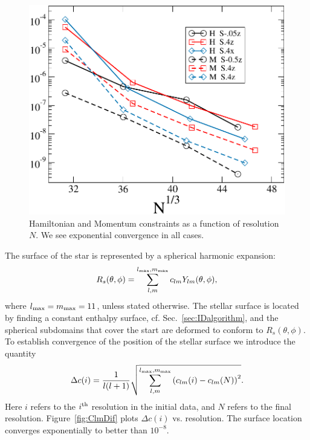 \documentclass[aps,prd,amsmath,floatfix
,twocolumn
,superscriptaddress,nofootinbib,showpacs]{revtex4-1}
\theoremstyle{plain} \newtheorem{thm}{Theorem} \newtheorem{lem}{Lemma}
\begin{document}
\begin{figure}
\includegraphics[width=0.95\columnwidth]{HamMom}
\caption{{\label{fig:HamMom}}Hamiltonian and Momentum constraints as a function of resolution $N$. We see exponential
  convergence in all cases.}
\end{figure}

 The surface of the star is represented by a spherical harmonic expansion:
\begin{equation}
R_s(\theta,\phi) = \sum^{l_{\rm max},m_{\rm
    max}}_{l,m}c_{lm}Y_{lm}(\theta,\phi),
\end{equation}
where $l_{\rm max}= m_{\rm max} = 11$, unless stated otherwise.
The stellar surface is located by finding a constant enthalpy surface, cf. Sec.~\ref{sec:IDalgorithm}, and the spherical subdomains that cover the start are deformed to conform to $R_s(\theta,\phi)$.
To establish convergence of the position of the stellar surface we
introduce the quantity
\begin{equation}
\label{eq:Deltac}
\Delta c(i) = \frac{1}{l(l+1)} \sqrt{\sum^{l_{\rm max},m_{\rm
      max}}_{l,m}\left(c_{lm}(i)-c_{lm}(N)\right)^2}.
\end{equation}
Here $i$ refers to the $i^{\rm th}$ resolution in the initial data,
and $N$ refers to the final resolution. Figure~\ref{fig:ClmDif} plots $\Delta c(i)$ vs. resolution.  The surface location converges exponentially to better than $10^{-8}$.
\end{document}
